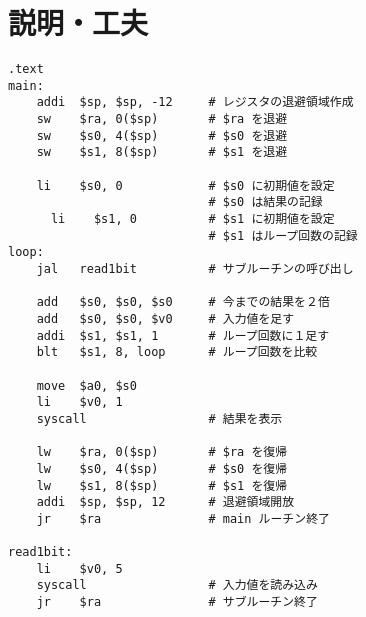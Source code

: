 \documentclass{jarticle}
\begin{document}
  \section{説明・工夫}
    \begin{lstlisting}[caption=assignment1.s]
    .text
main:
    addi  $sp, $sp, -12     # レジスタの退避領域作成
    sw    $ra, 0($sp)       # $ra を退避
    sw    $s0, 4($sp)       # $s0 を退避
    sw    $s1, 8($sp)       # $s1 を退避

    li    $s0, 0            # $s0 に初期値を設定
                            # $s0 は結果の記録
      li    $s1, 0          # $s1 に初期値を設定
                            # $s1 はループ回数の記録
loop:
    jal   read1bit          # サブルーチンの呼び出し

    add   $s0, $s0, $s0     # 今までの結果を２倍
    add   $s0, $s0, $v0     # 入力値を足す
    addi  $s1, $s1, 1       # ループ回数に１足す
    blt   $s1, 8, loop      # ループ回数を比較

    move  $a0, $s0
    li    $v0, 1
    syscall                 # 結果を表示

    lw    $ra, 0($sp)       # $ra を復帰
    lw    $s0, 4($sp)       # $s0 を復帰
    lw    $s1, 8($sp)       # $s1 を復帰
    addi  $sp, $sp, 12      # 退避領域開放
    jr    $ra               # main ルーチン終了

read1bit:
    li    $v0, 5
    syscall                 # 入力値を読み込み
    jr    $ra               # サブルーチン終了
    \end{lstlisting}
\end{document}

